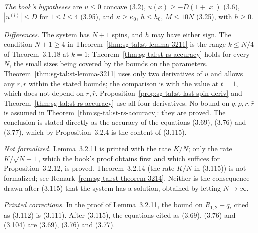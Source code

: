 \begin{remark}
\label{rem:sg-tal:st-prop-3212}
\emph{The book's hypotheses} are $u\le0$ concave (3.2), $u(x)\ge-D(1+|x|)$ (3.6), $|u^{(l)}|\le D$ for
$1\le l\le4$ (3.95), and $\kappa\ge\kappa_0$, $h\le h_0$, $M\le10N$ (3.25), with $h\ge0$.

\emph{Differences.} The system has $N+1$ spins, and $h$ may have either sign. The condition $N+1\ge4$ in
Theorem~\ref{thm:sg-tal:st-lemma-3211} is the range $k\le N/4$ of Theorem~3.1.18 at $k=1$;
Theorem~\ref{thm:sg-tal:st-rs-accuracy} holds for every $N$, the small sizes being covered by the bounds on the
parameters. Theorem~\ref{thm:sg-tal:st-lemma-3211} uses only two derivatives
of $u$ and allows any $r,\bar r$ within the stated bounds; the comparison is with the value at $t=1$, which does
not depend on $r,\bar r$. Proposition~\ref{prop:sg-tal:st-last-spin-deriv} and
Theorem~\ref{thm:sg-tal:st-rs-accuracy} use all four derivatives. No bound on $q,\rho,r,\bar r$ is assumed in
Theorem~\ref{thm:sg-tal:st-rs-accuracy}: they are proved. The conclusion is stated directly as the accuracy of
the equations (3.69), (3.76) and (3.77), which by Proposition~3.2.4 is the content of (3.115).

\emph{Not formalized.} Lemma~3.2.11 is printed with the rate $K/N$; only the rate $K/\sqrt{N+1}$, which the
book's proof obtains first and which suffices for Proposition~3.2.12, is proved. Theorem~3.2.14 (the rate $K/N$
in (3.115)) is not formalized; see Remark~\ref{rem:sg-tal:st-theorem-3214}. Neither is the consequence drawn
after (3.115) that the system has a solution, obtained by letting $N\to\infty$.

\emph{Printed corrections.} In the proof of Lemma~3.2.11, the bound on $R_{1,2}-q_t$ cited as (3.112) is (3.111).
After (3.115), the equations cited as (3.69), (3.76) and (3.104) are (3.69), (3.76) and (3.77).
\end{remark}

